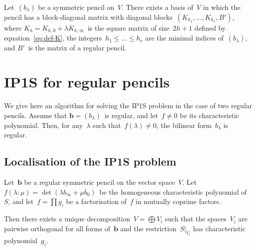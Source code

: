 \documentclass{lms}%
\begin{document}
\begin{prop}\label{prop:kronecker}%
Let~$(b_{λ})$ be a symmetric pencil on~$V$. There exists a basis of~$V$
in which the pencil has a block-diagonal matrix with diagonal
blocks~$(K_{h_1}, …, K_{h_r}, B')$, where $K_h = K_{h,0} + λ K_{h,∞}$~is
the square matrix of size~$2h+1$ defined by equation~\eqref{eq:def-K},
the integers~$h_1 ≤ … ≤ h_r$ are the minimal indices of~$(b_{λ})$, and
$B'$~is the matrix of a regular pencil.
\end{prop}
\section{IP1S for regular pencils}%
\label{S:IP1S-regular}

We give here an algorithm for solving the IP1S problem in the case of two
regular pencils. Assume that $\bm{b} = (b_{λ})$~is regular, and let~$f ≠ 0$
be its characteristic polynomial. Then, for any~$λ$ such that~$f(λ) ≠ 0$,
the bilinear form~$b_{λ}$ is regular.

\subsection{Localisation of the IP1S problem}%

\begin{lem}\label{lem:decomp-bezout}%
Let~$\bm{b}$ be a regular symmetric pencil on the vector space~$V$.
Let~$f(λ: μ) = \det (λ b_{∞} + μ b_0)$~be the homogeneous characteristic
polynomial of~$S$, and let~$f = ∏ g_i$ be a factorisation of~$f$ in
mutually coprime factors.

Then there exists a unique decomposition~$V = ⨁ V_i$ such that the
spaces~$V_i$ are pairwise orthogonal for all forms of~$\bm{b}$ and the
restriction~$S|_{V_i}$ has characteristic polynomial~$g_i$.
\end{lem}
\end{document}

